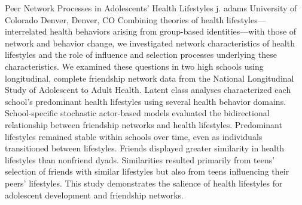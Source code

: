 
    \begin{abstract_online}{Peer Network Processes in Adolescents’ Health Lifestyles}{%
        j. adams}{%
        }{%
        University of Colorado Denver, Denver, CO}
    Combining theories of health lifestyles—interrelated health behaviors arising from group-based identities—with those of network and behavior change, we investigated network characteristics of health lifestyles and the role of influence and selection processes underlying these characteristics. We examined these questions in two high schools using longitudinal, complete friendship network data from the National Longitudinal Study of Adolescent to Adult Health. Latent class analyses characterized each school’s predominant health lifestyles using several health behavior domains. School-specific stochastic actor-based models evaluated the bidirectional relationship between friendship networks and health lifestyles. Predominant lifestyles remained stable within schools over time, even as individuals transitioned between lifestyles. Friends displayed greater similarity in health lifestyles than nonfriend dyads. Similarities resulted primarily from teens’ selection of friends with similar lifestyles but also from teens influencing their peers’ lifestyles. This study demonstrates the salience of health lifestyles for adolescent development and friendship networks. 
    
    \end{abstract_online}
    
